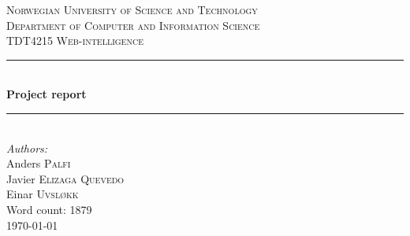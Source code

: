 \documentclass[11pt,a4paper]{report}
\newcommand{\HRule}{\rule{\linewidth}{0.5mm}}
\begin{document}
\begin{titlepage}
\center
\textsc{\Large Norwegian University of Science and Technology}\\[1.5cm]
\textsc{\large Department of Computer and Information Science}\\[0.5cm]
\textsc{TDT4215 Web-intelligence}\\[0.5cm]

\HRule \\[0.5cm]
{\huge \bfseries Project report}\\[0.2cm]
\HRule \\[1.5cm]

\Large \emph{Authors:}\\
Anders \textsc{Palfi}\\
Javier \textsc{Elizaga Quevedo}\\
Einar \textsc{Uvsløkk}\\[3cm]

{\large Word count: 1879}\\
{\large \today}\\[3cm]

\vfill

\end{titlepage}


\tableofcontents

\listoffigures
{}










%
%


\end{document}

